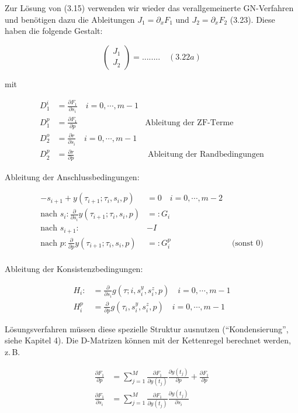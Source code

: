 Zur Lösung von (3.15) verwenden wir wieder das verallgemeinerte GN-Verfahren und benötigen dazu die Ableitungen $J_1 = \partial_x F_1$ und $J_2 = \partial_x F_2$ (3.23). Diese haben die folgende Gestalt:

\[ \begin{pmatrix} J_1 \\ J_2 \end{pmatrix} = ........ \quad (3.22a)\]

mit

\begin{align*}
D_1^i &= \frac{\partial F_1}{\partial s_i} \quad i=0,\cdots,m-1 \\
D_1^p &= \frac{\partial F_1}{\partial p} & \text{Ableitung der ZF-Terme} \\
D_2^o &= \frac{\partial r}{\partial s_i} \quad i=0,\cdots,m-1 \\
D_2^p &= \frac{\partial r}{\partial p} & \text{ Ableitung der Randbedingungen}
\end{align*}

Ableitung der Anschlussbedingungen:

\begin{align*}
-s_{i+1} + y(\tau_{i+1}; \tau_i, s_i, p) &= 0 \quad i=0,\cdots,m-2 \\
\text{nach }s_i: \frac{\partial}{\partial s_i} y(\tau_{i+1}; \tau_i, s_i, p) &=: G_i \\
\text{nach }s_{i+1}\colon &-I \\
\text{nach }p:  \frac{\partial}{\partial p}y(\tau_{i+1}; \tau_i, s_i, p) &=: G_i^p & \text{ (sonst 0)}\\
\end{align*}

Ableitung der Konsistenzbedingungen:

\begin{align*}
H_i :&= \frac{\partial}{\partial s_i} g(\tau;i, s_i^y, s_i^z, p) \quad i=0,\cdots,m-1 \\
H_i^p &= \frac{\partial}{\partial p} g(\tau_i, s_i^y, s_i^z, p) \quad i=0,\cdots,m-1
\end{align*}

Lösungsverfahren müssen diese spezielle Struktur ausnutzen ("`Kondensierung"', siehe Kapitel 4). Die D-Matrizen können mit der Kettenregel berechnet werden, z.\,B.

\begin{align*}
\frac{\partial F_1}{\partial p} &= \sum_{j=1}^M \frac{\partial F_1}{\partial y(t_j)} \frac{\partial y(t_j)}{\partial p} + \frac{\partial F_1}{\partial p} \\
\frac{\partial F_1}{\partial s_i} &= \sum_{j=1}^M \frac{\partial F_1}{\partial y(t_j)} \frac{\partial y(t_j)}{\partial s_i}
\end{align*}

